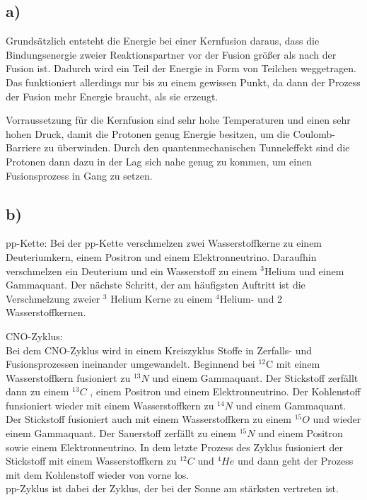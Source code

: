 \subsection{a)}

Grundsätzlich entsteht die Energie bei einer Kernfusion daraus, dass die Bindungsenergie zweier
Reaktionspartner vor der Fusion größer als nach der Fusion ist. Dadurch wird ein Teil der Energie
in Form von Teilchen weggetragen. Das funktioniert allerdings nur bis zu einem gewissen Punkt,
da dann der Prozess der Fusion mehr Energie braucht, als sie erzeugt.

\justifying Vorraussetzung für die Kernfusion sind sehr hohe Temperaturen und einen sehr hohen Druck, damit die Protonen genug Energie besitzen,
um die Coulomb-Barriere zu überwinden. Durch den quantenmechanischen Tunneleffekt sind die Protonen 
dann dazu in der Lag sich nahe genug zu kommen, um einen Fusionsprozess in Gang zu setzen. 


\subsection{b)}

pp-Kette:
Bei der pp-Kette verschmelzen zwei Wasserstoffkerne zu einem Deuteriumkern, einem Positron und einem Elektronneutrino.
Daraufhin verschmelzen ein Deuterium und ein Wasserstoff zu einem $^3$Helium und einem Gammaquant.
Der nächste Schritt, der am häufigsten Auftritt ist die Verschmelzung zweier $^3$ Helium Kerne zu
einem $^4$Helium- und 2 Wasserstoffkernen.


CNO-Zyklus:\\
Bei dem CNO-Zyklus wird in einem Kreiszyklus Stoffe in Zerfalls- und Fusionsprozessen ineinander umgewandelt.
Beginnend bei $^{12}$C mit einem Wasserstoffkern fusioniert zu $^{13}N $ und einem Gammaquant. 
Der Stickstoff zerfällt dann zu einem $^{13} C$ , einem Positron und einem Elektronneutrino.
Der Kohlenstoff funsioniert wieder mit einem Wasserstoffkern zu $^{14}N $ und einem Gammaquant.
Der Stickstoff fusioniert auch mit einem Wasserstoffkern zu einem $^{15}O $ und wieder einem Gammaquant.
Der Sauerstoff zerfällt zu einem $^{15}N $ und einem Positron sowie einem Elektronneutrino.
In dem letzte Prozess des Zyklus fusioniert der Stickstoff mit einem Wasserstoffkern zu $^{12} C $ und $^4 He$
und dann geht der Prozess mit dem Kohlenstoff wieder von vorne los.\\


\justifying pp-Zyklus ist dabei der Zyklus, der bei der Sonne am stärksten vertreten ist.

